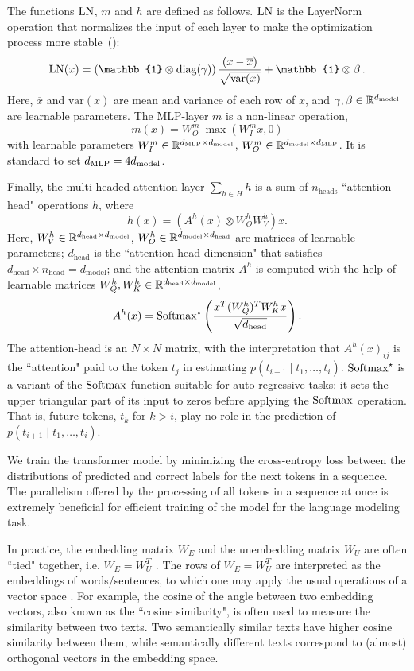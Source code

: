 The functions $\text{LN}$, $m$ and $h$ are defined as follows.
$\text{LN}$ is the LayerNorm operation that normalizes the input of each layer to make the optimization process more stable~(\cite{ba2016layer}):
\[
\LN(x) = \left(\mathbb{1} \otimes \text{diag}(\gamma) \right) \frac{(x-\overline{x})}{\sqrt{\text{var}(x)}} + \mathbb{1} \otimes \beta\,.
\]
Here, $\overline{x}$ and $\text{var}(x)$ are mean and variance of each row of $x$, and $\gamma, \beta \in \mathbb{R}^{d_{\text{model}}}$ are learnable parameters.
The MLP-layer $m$ is a non-linear operation,
\[
m(x) =W ^m_O \ \max(W_I^m x, 0)
\]
with learnable parameters $W^m_I \in \mathbb{R}^{d_{\text{MLP}} \times d_{\text{model}}}$, $W^m_O \in \mathbb{R}^{d_{\text{model}} \times d_{\text{MLP}}}$.
It is standard to set $d_{\text{MLP}} = 4 d_{\text{model}}$.

Finally, the multi-headed attention-layer $\sum_{h \in H} h$ is a sum of $n_{\text{heads}}$ ``attention-head" operations $h$, where
\[
h(x) = (A^h(x) \otimes W^h_O W^h_V) x.
\]
Here, $W^h_V \in \mathbb{R}^{d_{\text{head}} \times d_{\text{model}}}$,
$W^h_O \in \mathbb{R}^{d_{\text{model}} \times d_{\text{head}}}$
are matrices of learnable parameters;
$d_{\text{head}}$ is the ``attention-head dimension" that satisfies $d_{\text{head}} \times n_{\text{head}} = d_{\text{model}}$; and the attention matrix $A^h$ is computed with the help of learnable matrices
$W^h_Q, W^h_K \in \mathbb{R}^{d_{\text{head}} \times d_{\text{model}}}$,
\[
A^h(x) = \text{Softmax}^\star \left(\frac{x^T (W^h_Q)^T W^h_K x}{\sqrt{d_{\text{head}}}}\right).
\]
The attention-head is an $N \times N$ matrix, with the interpretation that $A^h(x)_{ij}$
is the ``attention" paid to the token
$t_j$ in estimating
$p(t_{i+1} \mid t_1, \dots, t_i)$.
$\text{Softmax}^\star$ is a variant of the $\text{Softmax}$ function suitable for auto-regressive tasks: it sets the upper triangular part of its input to zeros before applying the
$\text{Softmax}$ operation.
That is, future tokens, $t_k$ for $k > i$, play no role in the prediction of $p(t_{i+1} \mid t_1, \dots, t_i)$.

We train the transformer model by minimizing the cross-entropy loss between the distributions of predicted and correct labels for the next tokens in a sequence.
The parallelism offered by the processing of all tokens in a sequence at once is extremely beneficial for efficient training of the model for the language modeling task.

In practice, the embedding matrix $W_E$ and the unembedding matrix $W_U$ are often ``tied" together, i.e. $W_E = W_U^T$ \cite{press2017using, inan2017tying}.
The rows of $W_E = W_U^T$ are interpreted as the embeddings of words/sentences, to which one may apply the usual operations of a vector space \cite{Bengio:2003, mikolov-etal-2013-linguistic}.
For example, the cosine of the angle between two embedding vectors, also known as the ``cosine similarity", is often used to measure the similarity between two texts.
Two semantically similar texts have higher cosine similarity between them, while semantically different texts correspond to (almost) orthogonal vectors in the embedding space.

